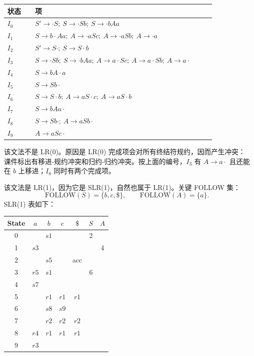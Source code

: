 \documentclass[UTF8,fontset=none,11pt]{ctexart}
\newcommand{\FOLLOW}{\ensuremath{\mathrm{FOLLOW}}}
\begin{document}
\begin{small}
\begin{longtable}{L{0.12\linewidth}L{0.78\linewidth}}
\toprule
状态 & 项 \\
\midrule
\(I_0\) & \(S'\to\cdot S;\ S\to\cdot Sb;\ S\to\cdot bAa\) \\
\(I_1\) & \(S\to b\cdot Aa;\ A\to\cdot aSc;\ A\to\cdot aSb;\ A\to\cdot a\) \\
\(I_2\) & \(S'\to S\cdot;\ S\to S\cdot b\) \\
\(I_3\) & \(S\to\cdot Sb;\ S\to\cdot bAa;\ A\to a\cdot Sc;\ A\to a\cdot Sb;\ A\to a\cdot\) \\
\(I_4\) & \(S\to bA\cdot a\) \\
\(I_5\) & \(S\to Sb\cdot\) \\
\(I_6\) & \(S\to S\cdot b;\ A\to aS\cdot c;\ A\to aS\cdot b\) \\
\(I_7\) & \(S\to bAa\cdot\) \\
\(I_8\) & \(S\to Sb\cdot;\ A\to aSb\cdot\) \\
\(I_9\) & \(A\to aSc\cdot\) \\
\bottomrule
\end{longtable}
\end{small}

该文法不是 LR(0)。原因是 LR(0) 完成项会对所有终结符规约，因而产生冲突：课件标出有移进-规约冲突和归约-归约冲突。按上面的编号，\(I_3\) 有 \(A\to a\cdot\) 且还能在 \(b\) 上移进；\(I_8\) 同时有两个完成项。

该文法是 LR(1)，因为它是 SLR(1)，自然也属于 LR(1)。关键 FOLLOW 集：
\[
\FOLLOW(S)=\{b,c,\$\},\qquad \FOLLOW(A)=\{a\}.
\]
SLR(1) 表如下：

\begin{center}
\small
\begin{tabular}{c|cccc|cc}
\toprule
State & \(a\) & \(b\) & \(c\) & \(\$\) & \(S\) & \(A\) \\
\midrule
0 &  & \(s1\) &  &  & 2 &  \\
1 & \(s3\) &  &  &  &  & 4 \\
2 &  & \(s5\) &  & acc &  &  \\
3 & \(r5\) & \(s1\) &  &  & 6 &  \\
4 & \(s7\) &  &  &  &  &  \\
5 &  & \(r1\) & \(r1\) & \(r1\) &  &  \\
6 &  & \(s8\) & \(s9\) &  &  &  \\
7 &  & \(r2\) & \(r2\) & \(r2\) &  &  \\
8 & \(r4\) & \(r1\) & \(r1\) & \(r1\) &  &  \\
9 & \(r3\) &  &  &  &  &  \\
\bottomrule
\end{tabular}
\end{center}
\end{document}
